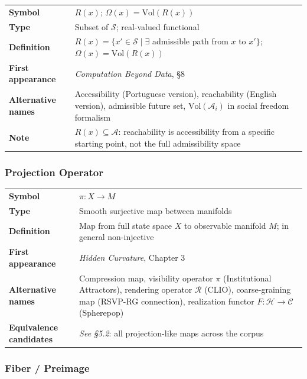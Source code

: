 \documentclass[11pt, a4paper]{article}
\begin{document}
\begin{longtable}{lp{10cm}}
\textbf{Symbol} & $R(x)$; $\Omega(x) = \mathrm{Vol}(R(x))$ \\
\textbf{Type} & Subset of $\mathcal{S}$; real-valued functional \\
\textbf{Definition} & $R(x) = \{x' \in \mathcal{S} \mid \exists$
  admissible path from $x$ to $x'\}$; $\Omega(x) = \mathrm{Vol}(R(x))$ \\
\textbf{First appearance} & \textit{Computation Beyond Data}, §8 \\
\textbf{Alternative names} & Accessibility (Portuguese version),
  reachability (English version), admissible future set,
  $\mathrm{Vol}(\mathcal{A}_i)$ in social freedom formalism \\
\textbf{Note} & $R(x) \subseteq \mathcal{A}$: reachability is accessibility
  from a specific starting point, not the full admissibility space \\
\end{longtable}

\subsubsection{Projection Operator}

\begin{longtable}{lp{10cm}}
\textbf{Symbol} & $\pi: X \to M$ \\
\textbf{Type} & Smooth surjective map between manifolds \\
\textbf{Definition} & Map from full state space $X$ to observable manifold
  $M$; in general non-injective \\
\textbf{First appearance} & \textit{Hidden Curvature}, Chapter 3 \\
\textbf{Alternative names} & Compression map, visibility operator $\pi$
  (Institutional Attractors), rendering operator $\mathcal{R}$ (CLIO),
  coarse-graining map (RSVP-RG connection), realization functor $F:
  \mathcal{H} \to \mathcal{C}$ (Spherepop) \\
\textbf{Equivalence candidates} & \textit{See §5.2}: all projection-like
  maps across the corpus \\
\end{longtable}

\subsubsection{Fiber / Preimage}
\end{document}
